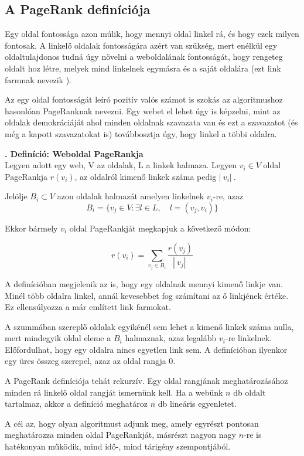 \documentclass[12pt,a4paper]{article}
\newcounter{definicioszam}
\newenvironment{definicio}[1]
{{\medskip}\noindent \stepcounter{definicioszam}
{\bfseries{\thedefinicioszam. Definíció: #1\\[1ex]}}}{\bigskip }
\begin{document}
\subsection{A PageRank definíciója}

Egy oldal fontossága azon múlik, hogy mennyi oldal linkel rá, és hogy ezek milyen fontosak. A linkelő oldalak fontosságára azért van szükség, mert enélkül egy oldaltulajdonos tudná úgy növelni a weboldalának fontosságát, hogy rengeteg oldalt hoz létre, melyek mind linkelnek egymásra és a saját oldalára (ezt link farmnak nevezik \cite{lang}).

Az egy oldal fontosságát leíró pozitív valós számot is szokás az algoritmushoz hasonlóan PageRanknak nevezni. Egy webet el lehet úgy is képzelni, mint az oldalak demokráciáját ahol minden oldalnak szavazata van és ezt a szavazatot (és még a kapott szavazatokat is) továbbosztja úgy, hogy linkel a többi oldalra.

\begin{definicio}{Weboldal PageRankja}
	Legyen adott egy web, V az oldalak, L a linkek halmaza.
	Legyen $v_i \in V$ oldal PageRankja $r(v_i)$, az oldalról kimenő linkek száma pedig $ |\ v_i |\ $. 
	
	Jelölje $B_i \subset V$ azon oldalak halmazát amelyen linkelnek $v_i$-re, azaz
	\[B_i = \{ v_j \in V: \exists l \in L, \quad l = (v_j,v_i) \} \]
	
	Ekkor bármely $v_i$ oldal PageRankját megkapjuk a következő módon:
	
	\[ r(v_i) = \sum_{v_j \in B_i} \frac{r(v_j)}{ |\ v_j|\ } \]
\end{definicio}

A definícióban megjelenik az is, hogy egy oldalnak mennyi kimenő linkje van. Minél több oldalra linkel, annál kevesebbet fog számítani az ő linkjének értéke. Ez ellensúlyozza a már említett link farmokat.

A szummában szereplő oldalak egyikénél sem lehet a kimenő linkek száma nulla, mert mindegyik oldal eleme a $B_i$ halmaznak, azaz legalább $v_i$-re linkelnek. Előfordulhat, hogy egy oldalra nincs egyetlen link sem. A definícióban ilyenkor egy üres összeg szerepel, azaz az oldal rangja 0.

\bigskip

A PageRank definíciója tehát rekurzív. Egy oldal rangjának meghatározásához minden rá linkelő oldal rangját ismernünk kell. Ha a webünk $n$ db oldalt tartalmaz, akkor a definíció meghatároz $n$ db lineáris egyenletet.

A cél az, hogy olyan algoritmust adjunk meg, amely egyrészt pontosan meghatározza minden oldal PageRankját, másrészt nagyon nagy $n$-re is hatékonyan működik, mind idő-, mind tárigény szempontjából. 
\end{document}

